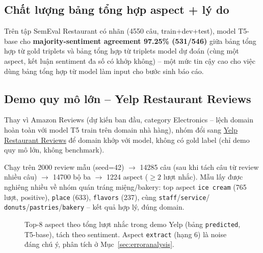 \documentclass[11pt,a4paper]{article}
\begin{document}
\subsection{Chất lượng bảng tổng hợp aspect + lý do}

Trên tập SemEval Restaurant có nhãn (4550 câu, train+dev+test), model
T5-base cho \textbf{majority-sentiment agreement 97.25\% (531/546)} giữa
bảng tổng hợp từ gold triplets và bảng tổng hợp từ triplets model dự đoán
(cùng một aspect, kết luận sentiment đa số có khớp không) -- một mức tin
cậy cao cho việc dùng bảng tổng hợp từ model làm input cho bước sinh báo
cáo.

\subsection{Demo quy mô lớn -- Yelp Restaurant Reviews}

Thay vì Amazon Reviews (dự kiến ban đầu, category Electronics -- lệch
domain hoàn toàn với model T5 train trên domain nhà hàng), nhóm đổi
sang \href{https://www.kaggle.com/datasets/farukalam/yelp-restaurant-reviews}{Yelp
Restaurant Reviews} để domain khớp với model, không có gold label (chỉ
demo quy mô lớn, không benchmark).

Chạy trên 2000 review mẫu (seed=42) $\to$ 14285 câu (sau khi tách câu
từ review nhiều câu) $\to$ 14700 bộ ba $\to$ 1224 aspect ($\geq 2$ lượt
nhắc). Mẫu lấy được nghiêng nhiều về nhóm quán tráng miệng/bakery: top
aspect \texttt{ice cream} (765 lượt, positive), \texttt{place} (633),
\texttt{flavors} (237), cùng \texttt{staff}/\texttt{service}/
\texttt{donuts}/\texttt{pastries}/\texttt{bakery} -- kết quả hợp lý,
đúng domain.

\begin{figure}[h]
\centering
{}
\caption{Top-8 aspect theo tổng lượt nhắc trong demo Yelp (bảng
\texttt{predicted}, T5-base), tách theo sentiment. Aspect \texttt{extract}
(hạng 6) là noise đáng chú ý, phân tích ở Mục~\ref{sec:erroranalysis}.}
\label{fig:yelp-aspects}
\end{figure}
\end{document}
